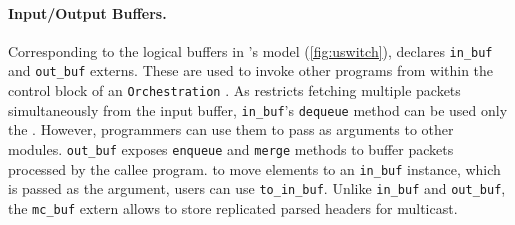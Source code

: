 \documentclass[letterpaper,twocolumn,10pt]{article}
\begin{document}
\paragraph{Input/Output Buffers.}
Corresponding to the logical buffers in \uswitch's model
(\cref{fig:uswitch}), \uarch declares \texttt{in\_buf} and
\texttt{out\_buf} externs. These are used to invoke other programs
from within the control block of an \texttt{Orchestration} \upipeline.
As \uswitch restricts fetching multiple packets simultaneously
from the input buffer, \texttt{in\_buf}'s \texttt{dequeue} method
can be used only  the \uswitch. However, programmers can use them to
pass as arguments to other modules. \texttt{out\_buf} exposes
\texttt{enqueue} and \texttt{merge} methods to buffer packets
processed by the callee program. to move elements to an
\texttt{in\_buf} instance, which is passed as the argument, users
can use \texttt{to\_in\_buf}. Unlike \texttt{in\_buf} and
\texttt{out\_buf}, the \texttt{mc\_buf} extern allows to store 
replicated parsed headers for multicast.

\end{document}
